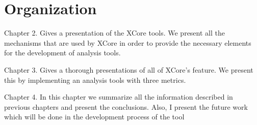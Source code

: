 \section{Organization}

        Chapter 2.  Gives a presentation of the XCore tools. We present all the mechanisms that are used by XCore in order to provide the necessary elements for the development of analysis
tools.

        Chapter 3. Gives a thorough presentations of all of XCore's feature. We present this by implementing an analysis tools with three metrics. 

        Chapter 4. In this chapter we summarize all the information
described in previous chapters and present the conclusions. Also, I present the future work which will be done in the development
process of the tool


